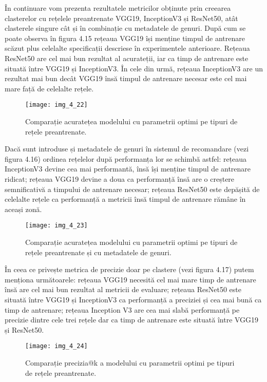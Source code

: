 \vspace{5mm}
În continuare vom prezenta rezultatele metricilor obținute prin creearea clasterelor cu rețelele preantrenate VGG19, InceptionV3 și ResNet50, atât clasterele singure cât și în combinație cu metadatele de genuri. După cum se poate observa în figura 4.15 rețeaua VGG19 își menține timpul de antrenare scăzut plus celelalte specificații descriese în experimentele anterioare. Rețeaua ResNet50 are cel mai bun rezultat al acurateții, iar ca timp de antrenare este situată între VGG19 și InceptionV3. În cele din urmă, rețeaua InceptionV3 are un rezultat mai bun decât VGG19 însă timpul de antrenare necesar este cel mai mare față de celelalte rețele.
\begin{figure}[!h]
	\centering
	\texttt{[image: img\_4\_22]}
	\caption[Comparație acuratețea modelului cu parametrii optimi pe tipuri de rețele preantrenate]{Comparație acuratețea modelului cu parametrii optimi pe tipuri de rețele preantrenate.}
\end{figure}

Dacă sunt introduse și metadatele de genuri în sistemul de recomandare (vezi figura 4.16) ordinea rețelelor după performanța lor se schimbă astfel: rețeaua InceptionV3 devine cea mai performantă, însă își menține timpul de antrenare ridicat; rețeaua VGG19 devine a doua ca performanță însă are o creștere semnificativă a timpului de antrenare necesar; rețeaua ResNet50 este depășită de celelalte rețele ca performanță a metricii însă timpul de antrenare rămâne în aceași zonă.
\begin{figure}[!h]
	\centering
	\texttt{[image: img\_4\_23]}
	\caption[Comparație acuratețea modelului cu parametrii optimi pe tipuri de rețele preantrenate și cu metadatele de genuri]{Comparație acuratețea modelului cu parametrii optimi pe tipuri de rețele preantrenate și cu metadatele de genuri.}
\end{figure}

În ceea ce privește metrica de precizie doar pe clastere (vezi figura 4.17) putem menționa următoarele: rețeaua VGG19 necesită cel mai mare timp de antrenare însă are cel mai bun rezultat al metricii de evaluare; rețeaua ResNet50 este situată între VGG19 și InceptionV3 ca performanță a preciziei și cea mai bună ca timp de antrenare; rețeaua Inception V3 are cea mai slabă performanță pe precizie dintre cele trei rețele dar ca timp de antrenare este situată între VGG19 și ResNet50.
\begin{figure}[!h]
	\centering
	\texttt{[image: img\_4\_24]}
	\caption[Comparație precizia@k a modelului cu parametrii optimi pe tipuri de rețele preantrenate]{Comparație precizia@k a modelului cu parametrii optimi pe tipuri de rețele preantrenate.}
\end{figure}

